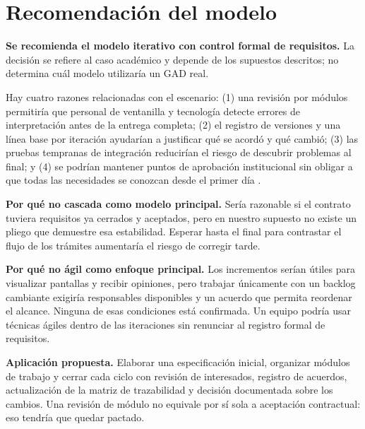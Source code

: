 \documentclass[10pt,a4paper,onecolumn]{IEEEtran}
\begin{document}
\section{Recomendación del modelo}
\textbf{Se recomienda el modelo iterativo con control formal de requisitos.} La decisión se refiere al caso académico y depende de los supuestos descritos; no determina cuál modelo utilizaría un GAD real.

Hay cuatro razones relacionadas con el escenario: (1) una revisión por módulos permitiría que personal de ventanilla y tecnología detecte errores de interpretación antes de la entrega completa; (2) el registro de versiones y una línea base por iteración ayudarían a justificar qué se acordó y qué cambió; (3) las pruebas tempranas de integración reducirían el riesgo de descubrir problemas al final; y (4) se podrían mantener puntos de aprobación institucional sin obligar a que todas las necesidades se conozcan desde el primer día \cite{pohl2025,ireb2026}.

\textbf{Por qué no cascada como modelo principal.} Sería razonable si el contrato tuviera requisitos ya cerrados y aceptados, pero en nuestro supuesto no existe un pliego que demuestre esa estabilidad. Esperar hasta el final para contrastar el flujo de los trámites aumentaría el riesgo de corregir tarde.

\textbf{Por qué no ágil como enfoque principal.} Los incrementos serían útiles para visualizar pantallas y recibir opiniones, pero trabajar únicamente con un backlog cambiante exigiría responsables disponibles y un acuerdo que permita reordenar el alcance. Ninguna de esas condiciones está confirmada. Un equipo podría usar técnicas ágiles dentro de las iteraciones sin renunciar al registro formal de requisitos.

\textbf{Aplicación propuesta.} Elaborar una especificación inicial, organizar módulos de trabajo y cerrar cada ciclo con revisión de interesados, registro de acuerdos, actualización de la matriz de trazabilidad y decisión documentada sobre los cambios. Una revisión de módulo no equivale por sí sola a aceptación contractual: eso tendría que quedar pactado.
\end{document}
